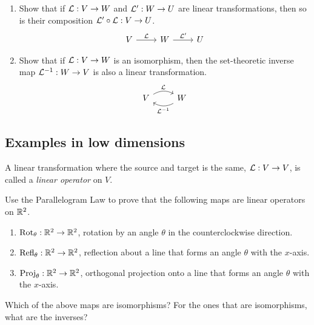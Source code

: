 \begin{qbox}
  \begin{enumerate}
    \item Show that if $\mathcal{L}: V \rightarrow W$ and $\mathcal{L}': W \rightarrow U$ are linear transformations, then so is their composition $\mathcal{L}' \circ \mathcal{L}: V \rightarrow U$.
    \begin{equation*}
      \begin{tikzcd}
        V \ar[r,"\call"] & W \ar[r,"\call'"] & U
      \end{tikzcd}
    \end{equation*}
    \item Show that if $\mathcal{L}: V \rightarrow W$ is an isomorphism, then the set-theoretic inverse map $\mathcal{L}^{-1}: W \rightarrow V$ is also a linear transformation.
    \begin{equation*}
      \begin{tikzcd}
        V \ar[r,"\call", bend left] & W \ar[l,"\call^{-1}", bend left]
      \end{tikzcd}
    \end{equation*}
  \end{enumerate}

\end{qbox}



\subsection{Examples in low dimensions}

\begin{definition}
    A linear transformation where the source and target is the same, $\mathcal{L}: V \rightarrow V$, is called a \emph{linear operator} on $V$.
\end{definition}

\begin{qbox}
  \label{q:rotationReflection}
  Use the Parallelogram Law to prove that the following maps are linear operators on $\mathbb{R}^2$.
  \begin{enumerate}
    \item $\mathrm{Rot}_{\theta}: \mathbb{R}^2 \rightarrow \mathbb{R}^2$, rotation by an angle $\theta$ in the counterclockwise direction.
    \item $\mathrm{Refl}_{\theta}: \mathbb{R}^2 \rightarrow \mathbb{R}^2$, reflection about a line that forms an angle $\theta$ with the $x$-axis.
    \item $\mathrm{Proj}_{\theta}: \mathbb{R}^2 \rightarrow \mathbb{R}^2$, orthogonal projection onto a line that forms an angle $\theta$ with the $x$-axis.
  \end{enumerate}
  Which of the above maps are isomorphisms? For the ones that are isomorphisms, what are the inverses?
\end{qbox}

